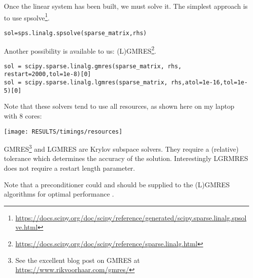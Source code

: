 
Once the linear system has been built, we must solve it. 
The simplest approach is to use 
spsolve\footnote{\url{https://docs.scipy.org/doc/scipy/reference/generated/scipy.sparse.linalg.spsolve.html}}.

\begin{lstlisting}       
sol=sps.linalg.spsolve(sparse_matrix,rhs)
\end{lstlisting}       

Another possibility is available to us: (L)GMRES\footnote{\url{https://docs.scipy.org/doc/scipy/reference/sparse.linalg.html}}.

\begin{lstlisting}       
sol = scipy.sparse.linalg.gmres(sparse_matrix, rhs, restart=2000,tol=1e-8)[0]
sol = scipy.sparse.linalg.lgmres(sparse_matrix, rhs,atol=1e-16,tol=1e-5)[0]
\end{lstlisting}       

Note that these solvers tend to use all resources, as shown here on my laptop with 8 cores:
\begin{center}
\texttt{[image: RESULTS/timings/resources]}
\end{center}

GMRES\footnote{See the excellent blog post on GMRES at \url{https://www.rikvoorhaar.com/gmres/}} 
and LGMRES are Krylov subspace solvers. They require a (relative) tolerance
which determines the accuracy of the solution. 
Interestingly LGRMRES does not require a restart length parameter.

Note that a preconditioner could and should be supplied to the (L)GMRES 
algorithms for optimal performance \cite{krhb12}.
